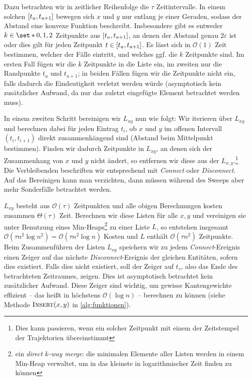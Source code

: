 Dazu betrachten wir in zeitlicher Reihenfolge die $\tau$ Zeitintervalle.
In einem solchen $\benbrace*{t_u,t_{u+1}}$ bewegen sich $x$ und $y$ nur entlang je einer Geraden, sodass der Abstand eine konvexe Funktion beschreibt.
Insbesondere gibt es entweder $k \in \set*{0,1,2}$ Zeitpunkte aus $\benbrace*{t_u,t_{u+1}}$, an denen der Abstand genau $2 \varepsilon$ ist oder dies gilt für jeden Zeitpunkt $t \in \benbrace*{t_u,t_{u+1}}$.
Es lässt sich in $\mathcal{O}(1)$ Zeit bestimmen, welcher der Fälle eintritt, und welches ggf. die $k$ Zeitpunkte sind.
Im ersten Fall fügen wir die $k$ Zeitpunkte in die Liste ein, im zweiten nur die Randpunkte $t_u$ und $t_{u+1}$; in beiden Fällen fügen wir die Zeitpunkte nicht ein, falls dadurch die Eindeutigkeit verletzt werden würde (asymptotisch kein zusätzlicher Aufwand, da nur das zuletzt eingefügte Element betrachtet werden muss).

In einem zweiten Schritt bereinigen wir $L_{xy}$ nun wie folgt: Wir iterieren über $L_{xy}$ und berechnen dabei für jeden Eintrag $t_i$, ob $x$ und $y$ im offenen Intervall $(t_i,t_{i+1})$ direkt zusammenhängend sind (Abstand beim Mittelpunkt bestimmen).
Finden wir dadurch Zeitpunkte in $L_{xy}$, an denen sich der Zusammenhang von $x$ und $y$ nicht ändert, so entfernen wir diese aus der $L_{x,y}$.\footnote{Dies kann passieren, wenn ein solcher Zeitpunkt mit einem der Zeitstempel der Trajektorien übereinstimmt}
Die Verbleibenden beschriften wir entsprechend mit \emph{Connect} oder \emph{Disconnect}.
Auf das Bereinigen kann man verzichten, dann müssen während des Sweeps aber mehr Sonderfälle betrachtet werden.

$L_{xy}$ besteht aus $\mathcal{O}(\tau)$ Zeitpunkten und alle obigen Berechnungen kosten zusammen $\Theta(\tau)$ Zeit.
Berechnen wir diese Listen für alle $x,y$ und vereinigen sie unter Benutzung eines Min-Heaps\footnote{ein \emph{direct $k$-way merge}: die minimalen Elemente aller Listen werden in einem Min-Heap verwaltet, um in das kleinste in logarithmischer Zeit finden zu können} zu einer Liste $L$, so entstehen insgesamt $\mathcal{O}(\tau n^2 \log n^2) = \mathcal{O}(\tau n^2 \log n)$ Kosten und $L$ enthält $\mathcal{O}(\tau n^2)$ Zeitpunkte.
Beim Zusammenführen der Listen $L_{xy}$ speichern wir zu jedem \emph{Connect}-Ereignis einen Zeiger auf das nächste \emph{Disconnect}-Ereignis der gleichen Entitäten, sofern dies existiert.
Falls dies nicht existiert, soll der Zeiger auf $t_\tau$, also das Ende des betrachteten Zeitraumes, zeigen.
Dies ist asymptotisch betrachtet kein zusätzlicher Aufwand.
Diese Zeiger sind wichtig, um gewisse Kantengewichte effizient -- das heißt in höchstens $\mathcal{O}(\log n)$ -- berechnen zu können (siehe Methode $\textsc{Insert}(x,y)$ in \cref{alg:funktionen}).

